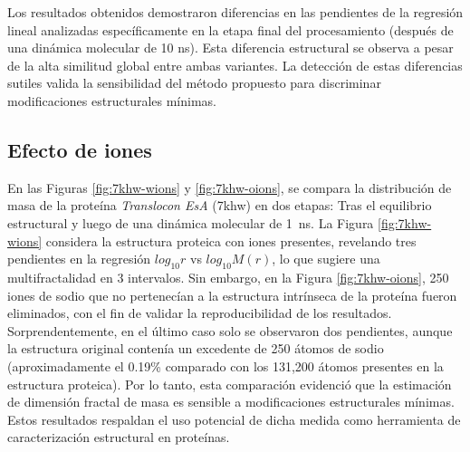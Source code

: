 	Los resultados obtenidos demostraron diferencias en las pendientes de la regresi\'{o}n lineal analizadas espec\'{i}ficamente en la etapa final del procesamiento (despu\'{e}s de una din\'{a}mica molecular de 10 ns). Esta diferencia estructural se observa a pesar de la alta similitud global entre ambas variantes.
	La detecci\'{o}n de estas diferencias sutiles valida la sensibilidad del m\'{e}todo propuesto para discriminar modificaciones estructurales m\'{i}nimas.
	
	
	
	\subsection*{Efecto de iones}
	
	En las Figuras \ref{fig:7khw-wions} y \ref{fig:7khw-oions}, se compara la distribuci\'{o}n de masa de la prote\'{i}na \textit{Translocon EsA} (7khw) en dos etapas: Tras el equilibrio estructural y luego de una din\'{a}mica molecular de 1~ns. La Figura \ref{fig:7khw-wions} considera la estructura proteica con iones presentes, revelando tres pendientes en la regresi\'{o}n $log_{10}r$ vs $log_{10}M(r)$, lo que sugiere una multifractalidad en 3 intervalos. Sin embargo, en la Figura \ref{fig:7khw-oions}, 250 iones de sodio que no pertenec\'{i}an a la estructura intr\'{i}nseca de la prote\'{i}na fueron eliminados, con el fin de validar la reproducibilidad de los resultados. Sorprendentemente, en el \'{u}ltimo caso solo se observaron dos pendientes, aunque la estructura original conten\'{i}a  un excedente de 250 \'{a}tomos de sodio (aproximadamente el 0.19\% comparado con los 131,200 átomos presentes en la estructura proteica). Por lo tanto, esta comparaci\'{o}n evidenci\'{o} que la estimaci\'{o}n de dimensi\'{o}n fractal de masa es sensible a modificaciones estructurales m\'{i}nimas. Estos resultados respaldan el uso potencial de dicha medida como herramienta de caracterizaci\'{o}n estructural en prote\'{i}nas. 
 
 	
 
